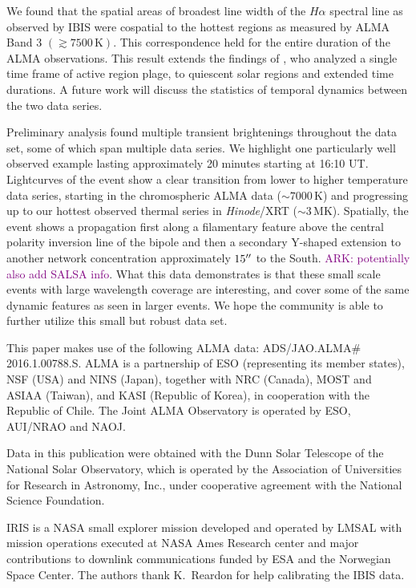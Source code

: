 \documentclass[twocolumn]{aastex62}
\newcommand{\unit}[1]{\ensuremath{\, \mathrm{#1}}}
\newcommand{\halpha}{\ensuremath{H\alpha}}
\newcommand{\ark}[1]{\textcolor{purple}{ARK: #1}}
\begin{document}
We found that the spatial areas of broadest line width of the \halpha{} spectral line as observed by IBIS were cospatial to the hottest regions as measured by ALMA Band 3 $(\gtrsim 7500\unit{K})$.
This correspondence held for the entire duration of the ALMA observations.
This result extends the findings of \citet{2019Molnar}, who analyzed a single time frame of active region plage, to quiescent solar regions and extended time durations.
A future work will discuss the statistics of temporal dynamics between the two data series.

Preliminary analysis found multiple transient brightenings throughout the data set, some of which span multiple data series.
We highlight one particularly well observed example lasting approximately 20 minutes starting at 16:10 UT.
Lightcurves of the event show a clear transition from lower to higher temperature data series, starting in the chromospheric ALMA data ($\sim7000\unit{K}$) and progressing up to our hottest observed thermal series in \textsl{Hinode}/XRT ($\sim3\unit{MK}$).
Spatially, the event shows a propagation first along a filamentary feature above the central polarity inversion line of the bipole and then a secondary Y-shaped extension to another network concentration approximately $15\mbox{$^{\prime\prime}$}$ to the South. 
\ark{potentially also add SALSA info}.
What this data demonstrates is that these small scale events with large wavelength coverage are interesting, and cover some of the same dynamic features as seen in larger events. We hope the community is able to further utilize this small but robust data set.





\acknowledgments
This paper makes use of the following ALMA data: ADS/JAO.ALMA$\#$2016.1.00788.S. ALMA is a partnership of ESO (representing its member states), NSF (USA) and NINS (Japan), together with NRC (Canada), MOST and ASIAA (Taiwan), and KASI (Republic of Korea), in cooperation with the Republic of Chile. The Joint ALMA Observatory is operated by ESO, AUI/NRAO and NAOJ.

Data in this publication were obtained with the Dunn Solar Telescope of the National Solar Observatory, which is operated by the Association of Universities for Research in Astronomy, Inc., under cooperative agreement with the National Science Foundation.  

IRIS is a NASA small explorer mission developed and operated by LMSAL with mission operations executed at NASA Ames Research center and major contributions to downlink communications funded by ESA and the Norwegian Space Center.
The authors thank K.~Reardon for help calibrating the IBIS data.
\end{document}
